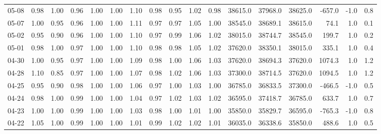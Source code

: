 \begin{threeparttable}
{\begin{tabular}{lrrrrrrrrrrrrrrrr}
  05-08 &   0.98 &   1.00 &         0.96 &     1.00 &           1.00 &        1.10 &        0.98 &        0.95 &          1.02 &          0.98 & 38615.0 & 37968.0 & 38625.0 &     -657.0 &                     -1.0 &                 0.8 \\
  05-07 &   1.00 &   0.95 &         0.96 &     1.00 &           1.00 &        1.11 &        0.97 &        0.97 &          1.05 &          1.00 & 38545.0 & 38689.1 & 38615.0 &       74.1 &                      1.0 &                 0.1 \\
  05-02 &   0.95 &   0.90 &         0.96 &     1.00 &           1.00 &        1.10 &        0.97 &        0.99 &          1.06 &          1.02 & 38015.0 & 38744.7 & 38545.0 &      199.7 &                      1.0 &                 0.2 \\
  05-01 &   0.98 &   1.00 &         0.97 &     1.00 &           1.00 &        1.10 &        0.98 &        0.98 &          1.05 &          1.02 & 37620.0 & 38350.1 & 38015.0 &      335.1 &                      1.0 &                 0.4 \\
  04-30 &   1.00 &   0.95 &         0.97 &     1.00 &           1.00 &        1.09 &        0.98 &        1.00 &          1.06 &          1.03 & 37620.0 & 38694.3 & 37620.0 &     1074.3 &                      1.0 &                 1.2 \\
  04-28 &   1.10 &   0.85 &         0.97 &     1.00 &           1.00 &        1.07 &        0.98 &        1.02 &          1.06 &          1.03 & 37300.0 & 38714.5 & 37620.0 &     1094.5 &                      1.0 &                 1.2 \\
  04-25 &   0.95 &   0.90 &         0.98 &     1.00 &           1.00 &        1.06 &        0.97 &        1.00 &          1.03 &          1.00 & 36785.0 & 36833.5 & 37300.0 &     -466.5 &                     -1.0 &                 0.5 \\
  04-24 &   0.98 &   1.00 &         0.99 &     1.00 &           1.00 &        1.04 &        0.97 &        1.02 &          1.03 &          1.02 & 36595.0 & 37418.7 & 36785.0 &      633.7 &                      1.0 &                 0.7 \\
  04-23 &   1.00 &   1.00 &         0.99 &     1.00 &           1.00 &        1.03 &        0.98 &        1.00 &          1.01 &          1.00 & 35850.0 & 35829.7 & 36595.0 &     -765.3 &                     -1.0 &                 0.8 \\
  04-22 &   1.05 &   1.00 &         0.99 &     1.00 &           1.00 &        1.01 &        0.99 &        1.02 &          1.02 &          1.01 & 36035.0 & 36338.6 & 35850.0 &      488.6 &                      1.0 &                 0.5 \\

\end{tabular}}
\end{threeparttable}
